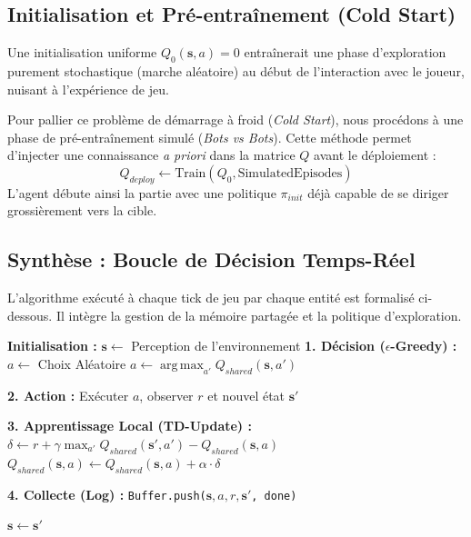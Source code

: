\documentclass[12pt,a4paper]{article}
\newcommand{\state}{\mathbf{s}}
\newcommand{\action}{a}
\newcommand{\reward}{r}
\newcommand{\Qval}{Q}
\DeclareMathOperator*{\argmax}{arg\,max}
\begin{document}
\subsection{Initialisation et Pré-entraînement (Cold Start)}
Une initialisation uniforme $\Qval_0(\state, \action) = 0$ entraînerait une phase d'exploration purement stochastique (marche aléatoire) au début de l'interaction avec le joueur, nuisant à l'expérience de jeu. 

Pour pallier ce problème de démarrage à froid (\textit{Cold Start}), nous procédons à une phase de pré-entraînement simulé (\textit{Bots vs Bots}). Cette méthode permet d'injecter une connaissance \textit{a priori} dans la matrice $\Qval$ avant le déploiement :
\begin{equation}
    \Qval_{deploy} \leftarrow \text{Train}(\Qval_{0}, \text{SimulatedEpisodes})
\end{equation}
L'agent débute ainsi la partie avec une politique $\pi_{init}$ déjà capable de se diriger grossièrement vers la cible.

\subsection{Synthèse : Boucle de Décision Temps-Réel}
L'algorithme exécuté à chaque tick de jeu par chaque entité est formalisé ci-dessous. Il intègre la gestion de la mémoire partagée et la politique d'exploration.

\begin{algorithm}[H]
\caption{Cycle de Vie d'un Agent (Online)}
\begin{algorithmic}[1]
\State \textbf{Initialisation :} $\state \leftarrow$ Perception de l'environnement
    \State \textbf{1. Décision ($\epsilon$-Greedy) :}
        \State $\action \leftarrow$ Choix Aléatoire
    \Else
        \State $\action \leftarrow \argmax_{a'} Q_{shared}(\state, a')$
    \EndIf
    
    \State \textbf{2. Action :} Exécuter $\action$, observer $\reward$ et nouvel état $\state'$
    
    \State \textbf{3. Apprentissage Local (TD-Update) :}
    \State $\delta \leftarrow \reward + \gamma \max_{a'} Q_{shared}(\state', a') - Q_{shared}(\state, \action)$
    \State $Q_{shared}(\state, \action) \leftarrow Q_{shared}(\state, \action) + \alpha \cdot \delta$
    
    \State \textbf{4. Collecte (Log) :}
    \State \texttt{Buffer.push($\state, \action, \reward, \state'$, done)}
    
    \State $\state \leftarrow \state'$
\EndWhile
\end{algorithmic}
\end{algorithm}
\end{document}
